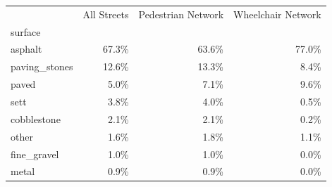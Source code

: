 \begin{center}
\begin{tabular}{|l|r|r|r|}
\hline
 & All Streets & Pedestrian Network & Wheelchair Network \\
surface &  &  &  \\
\hline
asphalt & 67.3\% & 63.6\% & 77.0\% \\
paving\_stones & 12.6\% & 13.3\% & 8.4\% \\
paved & 5.0\% & 7.1\% & 9.6\% \\
sett & 3.8\% & 4.0\% & 0.5\% \\
cobblestone & 2.1\% & 2.1\% & 0.2\% \\
other & 1.6\% & 1.8\% & 1.1\% \\
fine\_gravel & 1.0\% & 1.0\% & 0.0\% \\
metal & 0.9\% & 0.9\% & 0.0\% \\
\hline
\end{tabular}
\end{center}